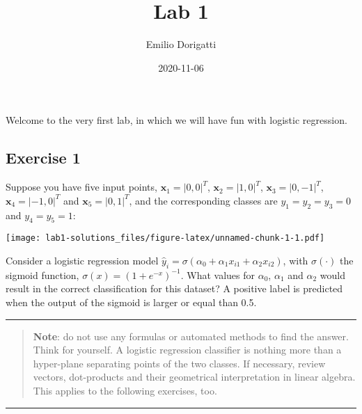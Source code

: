 \documentclass[
]{article}
\title{Lab 1}
\author{Emilio Dorigatti}
\date{2020-11-06}
\begin{document}
\maketitle

Welcome to the very first lab, in which we will have fun with logistic
regression.

\hypertarget{exercise-1}{%
\subsection{Exercise 1}\label{exercise-1}}

Suppose you have five input points, \(\textbf{x}_1=|0,0|^T\),
\(\textbf{x}_2=|1,0|^T\), \(\textbf{x}_3=|0,-1|^T\),
\(\textbf{x}_4=|-1,0|^T\) and \(\textbf{x}_5=|0,1|^T\), and the
corresponding classes are \(y_1=y_2=y_3=0\) and \(y_4=y_5=1\):

\texttt{[image: lab1-solutions\_files/figure-latex/unnamed-chunk-1-1.pdf]}

Consider a logistic regression model
\(\hat{y}_i=\sigma\left(\alpha_0+\alpha_1x_{i1}+\alpha_2x_{i2}\right)\),
with \(\sigma(\cdot)\) the sigmoid function,
\(\sigma(x)=\left(1+e^{-x}\right)^{-1}\). What values for \(\alpha_0\),
\(\alpha_1\) and \(\alpha_2\) would result in the correct classification
for this dataset? A positive label is predicted when the output of the
sigmoid is larger or equal than 0.5.

\begin{center}\rule{0.5\linewidth}{0.5pt}\end{center}

\begin{quote}
\textbf{Note}: do not use any formulas or automated methods to find the
answer. Think for yourself. A logistic regression classifier is nothing
more than a hyper-plane separating points of the two classes. If
necessary, review vectors, dot-products and their geometrical
interpretation in linear algebra. This applies to the following
exercises, too.
\end{quote}

\begin{center}\rule{0.5\linewidth}{0.5pt}\end{center}
\end{document}
